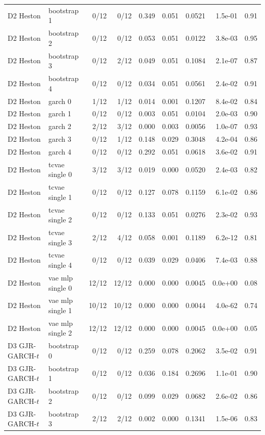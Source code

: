 \begin{tabular}{llrrrrrrr}
D2 Heston & bootstrap 1 & 0/12 & 0/12 & 0.349 & 0.051 & 0.0521 & 1.5e-01 & 0.91 \\
D2 Heston & bootstrap 2 & 0/12 & 0/12 & 0.053 & 0.051 & 0.0122 & 3.8e-03 & 0.95 \\
D2 Heston & bootstrap 3 & 0/12 & 2/12 & 0.049 & 0.051 & 0.1084 & 2.1e-07 & 0.87 \\
D2 Heston & bootstrap 4 & 0/12 & 0/12 & 0.034 & 0.051 & 0.0561 & 2.4e-02 & 0.91 \\
D2 Heston & garch 0 & 1/12 & 1/12 & 0.014 & 0.001 & 0.1207 & 8.4e-02 & 0.84 \\
D2 Heston & garch 1 & 0/12 & 0/12 & 0.003 & 0.051 & 0.0104 & 2.0e-03 & 0.90 \\
D2 Heston & garch 2 & 2/12 & 3/12 & 0.000 & 0.003 & 0.0056 & 1.0e-07 & 0.93 \\
D2 Heston & garch 3 & 0/12 & 1/12 & 0.148 & 0.029 & 0.3048 & 4.2e-04 & 0.86 \\
D2 Heston & garch 4 & 0/12 & 0/12 & 0.292 & 0.051 & 0.0618 & 3.6e-02 & 0.91 \\
D2 Heston & tcvae single 0 & 3/12 & 3/12 & 0.019 & 0.000 & 0.0520 & 2.4e-03 & 0.82 \\
D2 Heston & tcvae single 1 & 0/12 & 0/12 & 0.127 & 0.078 & 0.1159 & 6.1e-02 & 0.86 \\
D2 Heston & tcvae single 2 & 0/12 & 0/12 & 0.133 & 0.051 & 0.0276 & 2.3e-02 & 0.93 \\
D2 Heston & tcvae single 3 & 2/12 & 4/12 & 0.058 & 0.001 & 0.1189 & 6.2e-12 & 0.81 \\
D2 Heston & tcvae single 4 & 0/12 & 0/12 & 0.039 & 0.029 & 0.0406 & 7.4e-03 & 0.88 \\
D2 Heston & vae mlp single 0 & 12/12 & 12/12 & 0.000 & 0.000 & 0.0045 & 0.0e+00 & 0.08 \\
D2 Heston & vae mlp single 1 & 10/12 & 10/12 & 0.000 & 0.000 & 0.0044 & 4.0e-62 & 0.74 \\
D2 Heston & vae mlp single 2 & 12/12 & 12/12 & 0.000 & 0.000 & 0.0045 & 0.0e+00 & 0.05 \\
D3 GJR-GARCH-$t$ & bootstrap 0 & 0/12 & 0/12 & 0.259 & 0.078 & 0.2062 & 3.5e-02 & 0.91 \\
D3 GJR-GARCH-$t$ & bootstrap 1 & 0/12 & 0/12 & 0.036 & 0.184 & 0.2696 & 1.1e-01 & 0.90 \\
D3 GJR-GARCH-$t$ & bootstrap 2 & 0/12 & 0/12 & 0.099 & 0.029 & 0.0682 & 2.6e-02 & 0.86 \\
D3 GJR-GARCH-$t$ & bootstrap 3 & 2/12 & 2/12 & 0.002 & 0.000 & 0.1341 & 1.5e-06 & 0.83 \\

\end{tabular}
